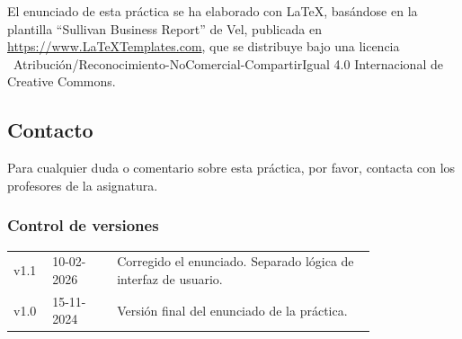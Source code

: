 \documentclass[
    a4paper, %
    12pt, %
]{CSSullivanBusinessReport}
\begin{document}
\begin{twothirdswidth}
    El enunciado de esta práctica se ha elaborado con \LaTeX, basándose en la plantilla ``Sullivan Business Report'' de Vel, publicada en \url{https://www.LaTeXTemplates.com}, que se distribuye bajo una licencia \ccbyncsaeu~Atribución/Reconocimiento-NoComercial-CompartirIgual 4.0 Internacional de Creative Commons.
    
    \subsection*{Contacto}
    
    Para cualquier duda o comentario sobre esta práctica, por favor, contacta con los profesores de la asignatura.
    
    \vfill %
    
    \subsubsection*{Control de versiones}
    
    \scriptsize %
    
    \begin{tabular}{@{} L{0.05\linewidth} L{0.15\linewidth} L{0.6\linewidth} @{}} %
        \toprule
        v1.1 & 10-02-2026 & Corregido el enunciado. Separado lógica de interfaz de usuario. \\
        v1.0 & 15-11-2024 & Versión final del enunciado de la práctica.\\
        \bottomrule
    \end{tabular}
\end{twothirdswidth}

\newpage


\begin{twothirdswidth} %
    \tableofcontents %
\end{twothirdswidth}

\newpage

\end{document}
